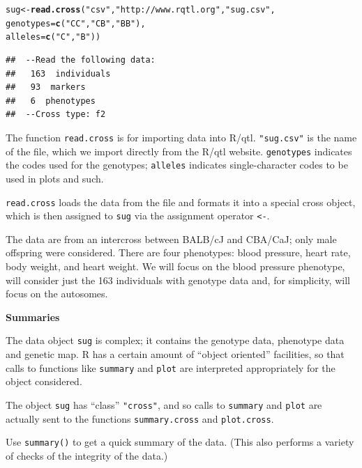 \documentclass[12pt]{article}\usepackage[]{graphicx}\usepackage[]{color}
\makeatletter
\newcommand{\hlstr}[1]{\textcolor[rgb]{0.192,0.494,0.8}{#1}}%
\newcommand{\hlstd}[1]{\textcolor[rgb]{0.345,0.345,0.345}{#1}}%
\newcommand{\hlkwb}[1]{\textcolor[rgb]{0.69,0.353,0.396}{#1}}%
\newcommand{\hlkwc}[1]{\textcolor[rgb]{0.333,0.667,0.333}{#1}}%
\newcommand{\hlkwd}[1]{\textcolor[rgb]{0.737,0.353,0.396}{\textbf{#1}}}%
\newenvironment{kframe}{%
 \def\at@end@of@kframe{}%
 \ifinner\ifhmode%
  \def\at@end@of@kframe{\end{minipage}}%
  \begin{minipage}{\columnwidth}%
 \fi\fi%
 \def\FrameCommand##1{\hskip\@totalleftmargin \hskip-\fboxsep
 \colorbox{shadecolor}{##1}\hskip-\fboxsep
     \hskip-\linewidth \hskip-\@totalleftmargin \hskip\columnwidth}%
 \MakeFramed {\advance\hsize-\width
   \@totalleftmargin\z@ \linewidth\hsize
   \@setminipage}}%
 {\par\unskip\endMakeFramed%
 \at@end@of@kframe}
\newenvironment{knitrout}{}{} %
\makeatother
\begin{document}
\begin{knitrout}
\color{fgcolor}\begin{kframe}
\begin{alltt}
\hlstd{sug} \hlkwb{<-} \hlkwd{read.cross}\hlstd{(}\hlstr{"csv"}\hlstd{,} \hlstr{"http://www.rqtl.org"}\hlstd{,} \hlstr{"sug.csv"}\hlstd{,}
                  \hlkwc{genotypes}\hlstd{=}\hlkwd{c}\hlstd{(}\hlstr{"CC"}\hlstd{,} \hlstr{"CB"}\hlstd{,} \hlstr{"BB"}\hlstd{),}
                  \hlkwc{alleles}\hlstd{=}\hlkwd{c}\hlstd{(}\hlstr{"C"}\hlstd{,} \hlstr{"B"}\hlstd{))}
\end{alltt}
\begin{verbatim}
##  --Read the following data:
## 	 163  individuals
## 	 93  markers
## 	 6  phenotypes
##  --Cross type: f2
\end{verbatim}
\end{kframe}
\end{knitrout}


The function {\tt read.cross} is for importing data into R/qtl.
{\tt "sug.csv"} is the name of the file, which we import directly
from the R/qtl website.  {\tt genotypes} indicates the codes used for
the genotypes; {\tt alleles} indicates single-character codes to be
used in plots and such.

{\tt read.cross} loads the data from the file and formats it into
a special cross object, which is then assigned to {\tt sug} via the
assignment operator {\tt <-}.

The data are from an intercross between BALB/cJ and CBA/CaJ; only male
offspring were considered.  There are four phenotypes: blood pressure,
heart rate, body weight, and heart weight.  We will focus on the blood
pressure phenotype, will consider just the 163 individuals with
genotype data and, for simplicity, will focus on the autosomes.


\bigskip
{\sffamily \textbf{Summaries}}
\nopagebreak

The data object {\tt sug} is complex; it contains the genotype
data, phenotype data and genetic map.  R has a certain amount of
``object oriented'' facilities, so that calls to functions like
{\tt summary} and {\tt plot} are interpreted appropriately for the object
considered.

The object {\tt sug} has ``class'' {\tt "cross"}, and so calls to
{\tt summary} and {\tt plot} are actually sent to the functions
{\tt summary.cross} and {\tt plot.cross}.

Use {\tt summary()} to get a quick summary of the data.  (This also
performs a variety of checks of the integrity of the data.)
\end{document}
